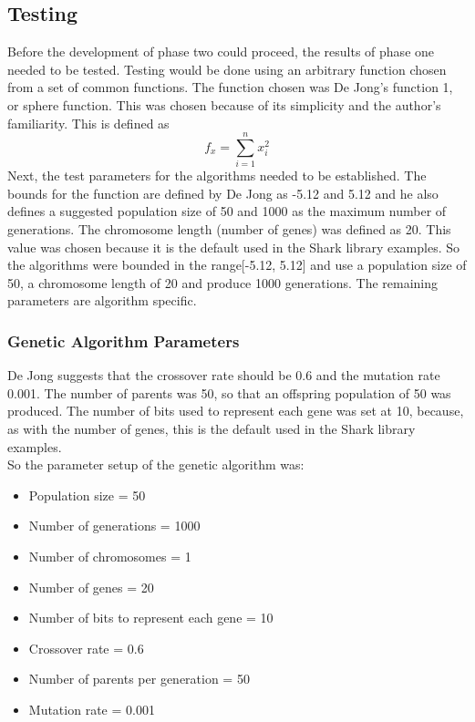 \subsection{Testing}
\label{sec:p1test}
Before the development of phase two could proceed, the results of phase one needed to be tested. Testing would be done using an arbitrary function chosen from a set of common functions\cite{geatbx}. The function chosen was De Jong's function 1, or sphere function. This was chosen because of its simplicity and the author's familiarity. This is defined as\cite{geatbx}
\begin{equation}
  f_{x} =\sum_{i=1}^{n}{x_{i}^{2}}
\end{equation}
Next, the test parameters for the algorithms needed to be established. The bounds for the function are defined by De Jong as -5.12 and 5.12\cite{geatbx} and he also defines a suggested population size of 50 and 1000 as the maximum number of generations\cite{gap}. The chromosome length (number of genes) was defined as 20. This value was chosen because it is the default used in the Shark library examples. So the algorithms were bounded in the range[-5.12, 5.12] and use a population size of 50, a chromosome length of 20 and produce 1000 generations. The remaining parameters are algorithm specific.

\subsubsection{Genetic Algorithm Parameters}
\label{sec:gaparams}
De Jong suggests that the crossover rate should be 0.6 and the mutation rate 0.001\cite{gap}. The number of parents was 50, so that an offspring population of 50 was produced. The number of bits used to represent each gene was set at 10, because, as with the number of genes, this is the default used in the Shark library examples.
\\So the parameter setup of the genetic algorithm was:
\begin{itemize}
  \item{Population size = 50}
  \item{Number of generations = 1000}
  \item{Number of chromosomes = 1}
  \item{Number of genes = 20}
  \item{Number of bits to represent each gene = 10}
  \item{Crossover rate = 0.6}
  \item{Number of parents per generation = 50}
  \item{Mutation rate = 0.001}
\end{itemize}

